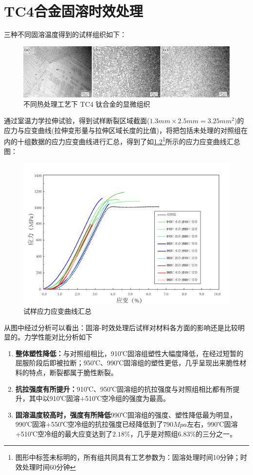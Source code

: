 \chapter{TC4合金固溶时效处理}
三种不同固溶温度得到的试样组织如下：
\begin{figure}[h!]
	\centering
	\includegraphics[width=0.7\linewidth]{pic/demo-mico}
	\caption{不同热处理工艺下 TC4 钛合金的显微组织}
	\label{fig:demo-mico}
\end{figure}
通过室温力学拉伸试验，得到试样断裂区域截面($ 1.3mm\times2.5mm=3.25mm^2 $)的应力与应变曲线(拉伸变形量与拉伸区域长度的比值)，将把包括未处理的对照组在内的十组数据的应力应变曲线进行汇总，得到了如\ref{fig:试样应力应变曲线汇总}\footnote{图形中标签未标明的，所有组共同具有工艺参数为：固溶处理时间10分钟；时效处理时间60分钟}所示的应力应变曲线汇总图：
\begin{figure}[h!]
	\centering
	\includegraphics[width=0.99\linewidth]{pic/试样应力应变曲线汇总min.png}
	\caption{试样应力应变曲线汇总}
	\label{fig:试样应力应变曲线汇总}
\end{figure}
从图中经过分析可以看出：固溶-时效处理后试样对材料各方面的影响还是比较明显的。力学性能对比分析如下
\begin{enumerate}
	\item \textbf{整体塑性降低：}与对照组相比，910℃固溶组塑性大幅度降低，在经过短暂的屈服阶段后即被拉断；950℃、990℃固溶组的塑性更低，几乎呈现出来脆性材料的特点，断裂都属于脆性断裂。
	\item \textbf{抗拉强度有所提升：}910℃、950℃固溶组的抗拉强度与对照组相比都有所提升，其中以910℃固溶+510℃空冷组的强度为最高。
	\item \textbf{固溶温度较高时，强度有所降低}990℃固溶组的强度、塑性降低最为明显，990℃固溶+550℃空冷组的抗拉强度已经降低到了$ 790Mpa $左右，990℃固溶+510℃空冷组的最大应变达到了$ 2.18\% $，几乎是对照组$ 6.83\% $的三分之一。
\end{enumerate}


